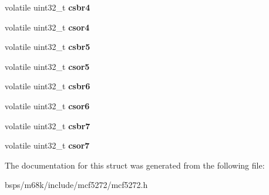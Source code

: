 \begin{DoxyCompactItemize}
volatile uint32\+\_\+t {\bfseries csbr4}
\item 
\mbox{\label{structchipsel__regs__t_a43437dd67a0c7dfba9db9786406376c5}} 
volatile uint32\+\_\+t {\bfseries csor4}
\item 
\mbox{\label{structchipsel__regs__t_a457e0208f8385b134fe74fff604c584c}} 
volatile uint32\+\_\+t {\bfseries csbr5}
\item 
\mbox{\label{structchipsel__regs__t_ad22bd3bce8adfeaa582204c7f97b64e4}} 
volatile uint32\+\_\+t {\bfseries csor5}
\item 
\mbox{\label{structchipsel__regs__t_ac5597bbb1338528851cbac644c928dab}} 
volatile uint32\+\_\+t {\bfseries csbr6}
\item 
\mbox{\label{structchipsel__regs__t_afcb3eaa970119acdfc0d42ddae4192d3}} 
volatile uint32\+\_\+t {\bfseries csor6}
\item 
\mbox{\label{structchipsel__regs__t_a69d50b4601a69f12fbd46e4b633930b4}} 
volatile uint32\+\_\+t {\bfseries csbr7}
\item 
\mbox{\label{structchipsel__regs__t_a471f60775507937903bcccf500676bf4}} 
volatile uint32\+\_\+t {\bfseries csor7}
\end{DoxyCompactItemize}


The documentation for this struct was generated from the following file\+:\begin{DoxyCompactItemize}
\item 
bsps/m68k/include/mcf5272/mcf5272.\+h\end{DoxyCompactItemize}
